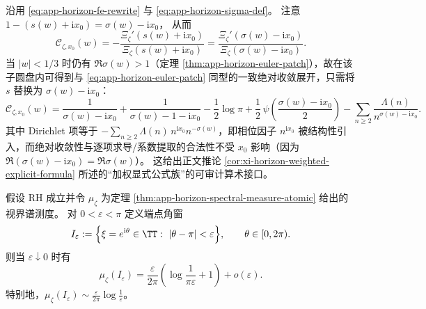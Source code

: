 \begin{remark}\label{rem:app-horizon-euler-patch-comoving}
沿用 \eqref{eq:app-horizon-fe-rewrite} 与 \eqref{eq:app-horizon-sigma-def}。
注意
\(
1-(s(w)+\mathrm{i}x_0)=\sigma(w)-\mathrm{i}x_0
\)，
从而
\[
\mathscr{C}_{\zeta,x_0}(w)
=-\frac{\Xi_{\zeta}'(s(w)+\mathrm{i}x_0)}{\Xi_{\zeta}(s(w)+\mathrm{i}x_0)}
=\frac{\Xi_{\zeta}'(\sigma(w)-\mathrm{i}x_0)}{\Xi_{\zeta}(\sigma(w)-\mathrm{i}x_0)}.
\]
当 \(|w|<1/3\) 时仍有 \(\Re\sigma(w)>1\)（定理 \ref{thm:app-horizon-euler-patch}），故在该子圆盘内可得到与 \eqref{eq:app-horizon-euler-patch} 同型的一致绝对收敛展开，只需将 \(s\) 替换为 \(\sigma(w)-\mathrm{i}x_0\)：
\[
\mathscr{C}_{\zeta,x_0}(w)
=\frac{1}{\sigma(w)-\mathrm{i}x_0}+\frac{1}{\sigma(w)-1-\mathrm{i}x_0}
-\frac12\log\pi+\frac12\,\psi\!\left(\frac{\sigma(w)-\mathrm{i}x_0}{2}\right)
-\sum_{n\ge2}\frac{\Lambda(n)}{n^{\sigma(w)-\mathrm{i}x_0}}.
\]
其中 Dirichlet 项等于 \(-\sum_{n\ge2}\Lambda(n)\,n^{\mathrm{i}x_0}n^{-\sigma(w)}\)，即相位因子 \(n^{\mathrm{i}x_0}\) 被结构性引入，而绝对收敛性与逐项求导/系数提取的合法性不受 \(x_0\) 影响（因为 \(\Re(\sigma(w)-\mathrm{i}x_0)=\Re\sigma(w)\)）。
这给出正文推论 \ref{cor:xi-horizon-weighted-explicit-formula} 所述的“加权显式公式族”的可审计算术接口。
\end{remark}

\begin{theorem}[端点 \texorpdfstring{$\xi=-1$}{xi=-1} 角窗质量的一阶渐近]\label{thm:app-horizon-endpoint-window-mass}
假设 RH 成立并令 \(\mu_{\zeta}\) 为定理 \ref{thm:app-horizon-spectral-measure-atomic} 给出的视界谱测度。
对 \(0<\varepsilon<\pi\) 定义端点角窗
\[
I_{\varepsilon}:=\Bigl\{\xi=e^{\mathrm{i}\theta}\in\TT:\ |\theta-\pi|<\varepsilon\Bigr\},
\qquad \theta\in[0,2\pi).
\]
则当 \(\varepsilon\downarrow 0\) 时有
\[
\mu_{\zeta}(I_{\varepsilon})
=
\frac{\varepsilon}{2\pi}\left(\log\frac{1}{\pi\varepsilon}+1\right)
+o(\varepsilon).
\]
特别地，\(\mu_{\zeta}(I_{\varepsilon})\sim \frac{\varepsilon}{2\pi}\log\frac{1}{\varepsilon}\)。
\end{theorem}

